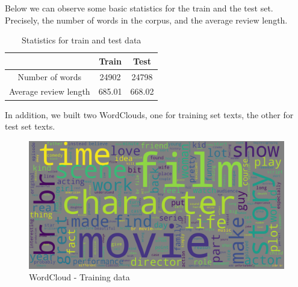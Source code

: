 \documentclass[fleqn,10pt]{SelfArx} %
\begin{document}



Below we can observe some basic statistics for the train and the test set. Precisely, the number of words in the corpus, and the average review length.

\begin{table}[ht]
\centering
\begin{tabular}{c c c }
	 & Train & Test  \\
	\hline
	Number of words & 24902 & 24798  \\
	Average review length & 685.01 & 668.02  \\
\end{tabular}
\caption{Statistics for train and test data}
\end{table}

In addition, we built two WordClouds, one for training set texts, the other for test set texts.

\begin{figure}[H]
\begin{center}
  \includegraphics[scale=0.1]{./images/WordCloud_train.png}
\end{center}
  \caption{WordCloud - Training data}
\end{figure}
\end{document}
